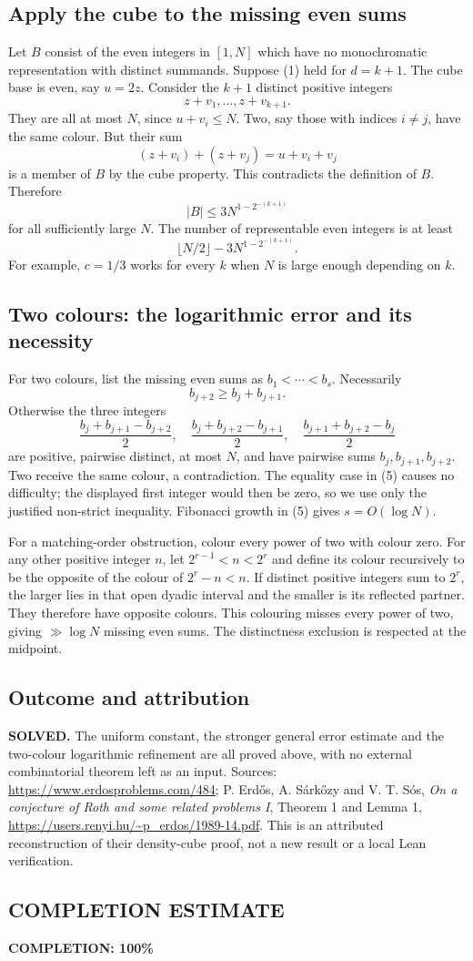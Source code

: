 \subsection*{Apply the cube to the missing even sums}
Let $B$ consist of the even integers in $[1,N]$ which have no monochromatic representation with distinct summands. Suppose (1) held for $d=k+1$. The cube base is even, say $u=2z$. Consider the $k+1$ distinct positive integers
\[z+v_1,\ldots,z+v_{k+1}.
\]
They are all at most $N$, since $u+v_i\le N$. Two, say those with indices $i\ne j$, have the same colour. But their sum
\[(z+v_i)+(z+v_j)=u+v_i+v_j
\]
is a member of $B$ by the cube property. This contradicts the definition of $B$. Therefore
\[|B|\le3N^{1-2^{-(k+1)}}
\]
for all sufficiently large $N$. The number of representable even integers is at least
\[\lfloor N/2\rfloor-3N^{1-2^{-(k+1)}}.
\]
For example, $c=1/3$ works for every $k$ when $N$ is large enough depending on $k$.

\subsection*{Two colours: the logarithmic error and its necessity}
For two colours, list the missing even sums as $b_1<\cdots<b_s$. Necessarily
\[b_{j+2}\ge b_j+b_{j+1}.\tag{5}\]
Otherwise the three integers
\[\frac{b_j+b_{j+1}-b_{j+2}}2,
\quad\frac{b_j+b_{j+2}-b_{j+1}}2,
\quad\frac{b_{j+1}+b_{j+2}-b_j}2
\]
are positive, pairwise distinct, at most $N$, and have pairwise sums $b_j,b_{j+1},b_{j+2}$. Two receive the same colour, a contradiction. The equality case in (5) causes no difficulty; the displayed first integer would then be zero, so we use only the justified non-strict inequality. Fibonacci growth in (5) gives $s=O(\log N)$.

For a matching-order obstruction, colour every power of two with colour zero. For any other positive integer $n$, let $2^{r-1}<n<2^r$ and define its colour recursively to be the opposite of the colour of $2^r-n<n$. If distinct positive integers sum to $2^r$, the larger lies in that open dyadic interval and the smaller is its reflected partner. They therefore have opposite colours. This colouring misses every power of two, giving $\gg\log N$ missing even sums. The distinctness exclusion is respected at the midpoint.

\subsection*{Outcome and attribution}
\textbf{SOLVED.} The uniform constant, the stronger general error estimate and the two-colour logarithmic refinement are all proved above, with no external combinatorial theorem left as an input.
Sources: \url{https://www.erdosproblems.com/484}; P. Erd\H{o}s, A. S\'ark\H{o}zy and V. T. S\'os, \emph{On a conjecture of Roth and some related problems I}, Theorem 1 and Lemma 1, \url{https://users.renyi.hu/~p_erdos/1989-14.pdf}. This is an attributed reconstruction of their density-cube proof, not a new result or a local Lean verification.

\subsection*{COMPLETION ESTIMATE}
\textbf{COMPLETION: 100\%}
